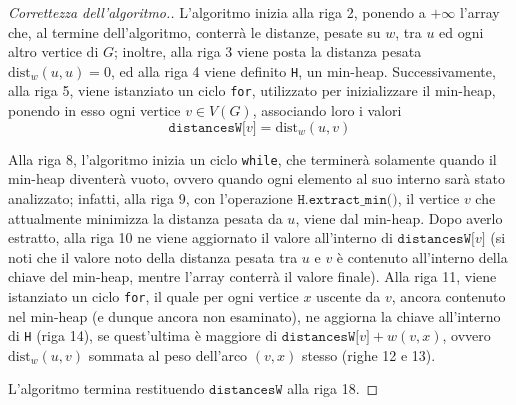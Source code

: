 \documentclass[a4paper, 12pt]{report}
\begin{document}
    \begin{proof}[Correttezza dell'algoritmo.]
        L'algoritmo inizia alla riga 2, ponendo a $+ \infty$ l'array che, al termine dell'algoritmo, conterrà le distanze, pesate su $w$, tra $u$ ed ogni altro vertice di $G$; inoltre, alla riga 3 viene posta la distanza pesata $\mathrm{dist}_w(u, u) = 0$, ed alla riga 4 viene definito \texttt{H}, un min-heap. Successivamente, alla riga 5, viene istanziato un ciclo \texttt{for}, utilizzato per inizializzare il min-heap, ponendo in esso ogni vertice $v \in V(G)$, associando loro i valori $$\texttt{distancesW[}v\texttt{]} = \mathrm{dist}_w(u, v)$$

        Alla riga 8, l'algoritmo inizia un ciclo \texttt{while}, che terminerà solamente quando il min-heap diventerà vuoto, ovvero quando ogni elemento al suo interno sarà stato analizzato; infatti, alla riga 9, con l'operazione $\texttt{H.extract\_min()}$, il vertice $v$ che attualmente minimizza la distanza pesata da $u$, viene  dal min-heap. Dopo averlo estratto, alla riga 10 ne viene aggiornato il valore all'interno di $\texttt{distancesW[}v\texttt{]}$ (si noti che il valore  noto della distanza pesata tra $u$ e $v$ è contenuto all'interno della chiave del min-heap, mentre l'array conterrà il valore finale). Alla riga 11, viene istanziato un ciclo \texttt{for}, il quale per ogni vertice $x$ uscente da $v$, ancora contenuto nel min-heap (e dunque ancora non esaminato), ne aggiorna la chiave all'interno di \texttt{H} (riga 14), se quest'ultima è maggiore di $\texttt{distancesW[}v \texttt{]} + w(v, x)$, ovvero $\mathrm{dist}_w(u, v)$ sommata al peso dell'arco $(v, x)$ stesso (righe 12 e 13).

        L'algoritmo termina restituendo $\texttt{distancesW}$ alla riga 18.
    \end{proof}
\end{document}
